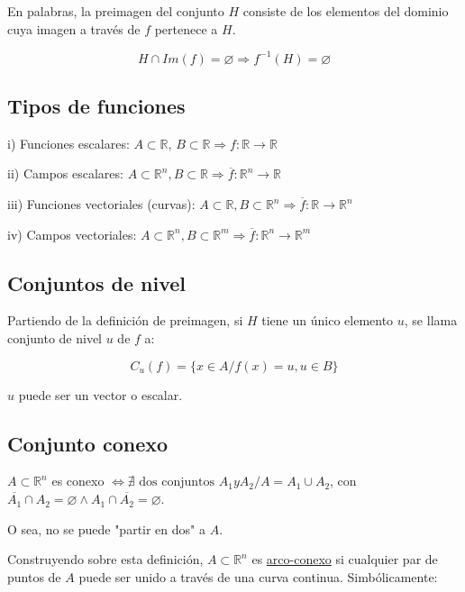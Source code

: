 \documentclass{article}
\renewcommand{\Bbb}{\mathbb}
\begin{document}
En palabras, la preimagen del conjunto $H$ consiste de los elementos del dominio cuya imagen a través de $f$ pertenece a $H$.

\begin{equation}
H \cap Im(f) = \varnothing \Longrightarrow f^{-1}(H) = \varnothing
\end{equation}

\subsection{Tipos de funciones}

i) Funciones escalares: $A \subset \Bbb R$, $B \subset \Bbb R \Longrightarrow f: \Bbb R \rightarrow \Bbb R$

ii) Campos escalares: $A \subset \Bbb R^n, B \subset \Bbb R \Longrightarrow \overline{f}: \Bbb R^n \rightarrow \Bbb R$

iii) Funciones vectoriales (curvas): $A \subset \Bbb R, B \subset \Bbb R^n \Longrightarrow \overline{f}: \Bbb R \rightarrow \Bbb R^n$

iv) Campos vectoriales: $A \subset \Bbb R^n, B \subset \Bbb R^m \Longrightarrow \overline{f}: \Bbb R^n \rightarrow \Bbb R^m$

\subsection{Conjuntos de nivel}

Partiendo de la definición de preimagen, si $H$ tiene un único elemento $u$, se llama conjunto de nivel $u$ de $f$ a:

\begin{equation}
C_u(f) = \{ x \in A / f(x) = u, u \in B \}
\end{equation}

$u$ puede ser un vector o escalar.

\subsection{Conjunto conexo}

$A \subset \Bbb R^n$ es conexo $\Longleftrightarrow \nexists \text{ dos conjuntos } A_1 y A_2 / A = A_1 \cup A_2$, con $\overline{A_1} \cap A_2 = \varnothing \wedge A_1 \cap \overline{A_2} = \varnothing$.

O sea, no se puede "partir en dos" a $A$.

Construyendo sobre esta definición, $A \subset \Bbb R^n$ es \underline{arco-conexo} si cualquier par de puntos de $A$ puede ser unido a través de una curva continua. Simbólicamente:
\end{document}
